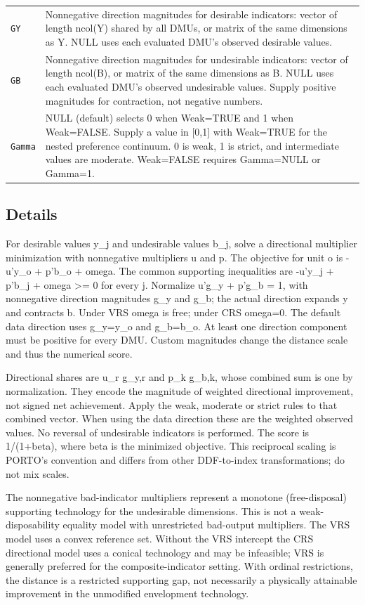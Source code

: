 \documentclass[10pt,a4paper]{article}
\newcommand{\field}[1]{\needspace{3\baselineskip}\subsection*{#1}}
\begin{document}
\begin{longtable}{@{}p{53mm}p{106mm}@{}}
\texttt{GY} & Nonnegative direction magnitudes for desirable indicators: vector of length ncol(Y) shared by all DMUs, or matrix of the same dimensions as Y. NULL uses each evaluated DMU's observed desirable values. \\[2pt]
\texttt{GB} & Nonnegative direction magnitudes for undesirable indicators: vector of length ncol(B), or matrix of the same dimensions as B. NULL uses each evaluated DMU's observed undesirable values. Supply positive magnitudes for contraction, not negative numbers. \\[2pt]
\texttt{Gamma} & NULL (default) selects 0 when Weak=TRUE and 1 when Weak=FALSE. Supply a value in [0,1] with Weak=TRUE for the nested preference continuum. 0 is weak, 1 is strict, and intermediate values are moderate. Weak=FALSE requires Gamma=NULL or Gamma=1. \\[2pt]
\end{longtable}
\field{Details}
For desirable values y\_j and undesirable values b\_j, solve a directional multiplier minimization with nonnegative multipliers u and p. The objective for unit o is -u'y\_o + p'b\_o + omega. The common supporting inequalities are -u'y\_j + p'b\_j + omega \textgreater{}= 0 for every j. Normalize u'g\_y + p'g\_b = 1, with nonnegative direction magnitudes g\_y and g\_b; the actual direction expands y and contracts b. Under VRS omega is free; under CRS omega=0. The default data direction uses g\_y=y\_o and g\_b=b\_o. At least one direction component must be positive for every DMU. Custom magnitudes change the distance scale and thus the numerical score.

Directional shares are u\_r g\_y,r and p\_k g\_b,k, whose combined sum is one by normalization. They encode the magnitude of weighted directional improvement, not signed net achievement. Apply the weak, moderate or strict rules to that combined vector. When using the data direction these are the weighted observed values. No reversal of undesirable indicators is performed. The score is 1/(1+beta), where beta is the minimized objective. This reciprocal scaling is PORTO's convention and differs from other DDF-to-index transformations; do not mix scales.

The nonnegative bad-indicator multipliers represent a monotone (free-disposal) supporting technology for the undesirable dimensions. This is not a weak-disposability equality model with unrestricted bad-output multipliers. The VRS model uses a convex reference set. Without the VRS intercept the CRS directional model uses a conical technology and may be infeasible; VRS is generally preferred for the composite-indicator setting. With ordinal restrictions, the distance is a restricted supporting gap, not necessarily a physically attainable improvement in the unmodified envelopment technology.
\end{document}
